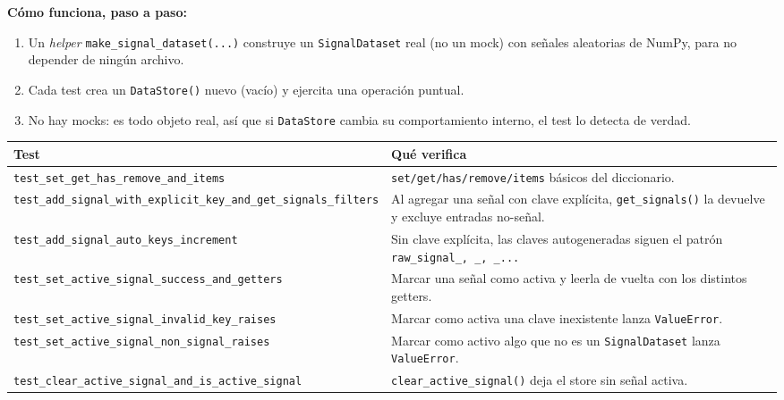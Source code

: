 \documentclass[11pt,a4paper]{article}
\begin{document}
\textbf{Cómo funciona, paso a paso:}
\begin{enumerate}
  \item Un \textit{helper} \texttt{make\_\allowbreak signal\_\allowbreak dataset(...)} construye un \texttt{SignalDataset} real
        (no un mock) con señales aleatorias de NumPy, para no depender de ningún archivo.
  \item Cada test crea un \texttt{DataStore()} nuevo (vacío) y ejercita una operación puntual.
  \item No hay mocks: es todo objeto real, así que si \texttt{DataStore} cambia su comportamiento interno,
        el test lo detecta de verdad.
\end{enumerate}

\begin{center}
\begin{longtable}{L{5.5cm}L{9cm}}
\toprule
\textbf{Test} & \textbf{Qué verifica} \\
\midrule
\endhead
\texttt{test\_\allowbreak set\_\allowbreak get\_\allowbreak has\_\allowbreak remove\_\allowbreak and\_\allowbreak items} & \texttt{set/get/has/remove/items} básicos del diccionario. \\
\texttt{test\_\allowbreak add\_\allowbreak signal\_\allowbreak with\_\allowbreak explicit\_\allowbreak key\_\allowbreak and\_\allowbreak get\_\allowbreak signals\_\allowbreak filters} & Al agregar una señal con clave explícita, \texttt{get\_\allowbreak signals()} la devuelve y excluye entradas no-señal. \\
\texttt{test\_\allowbreak add\_\allowbreak signal\_\allowbreak auto\_\allowbreak keys\_\allowbreak increment} & Sin clave explícita, las claves autogeneradas siguen el patrón \texttt{raw\_\allowbreak signal\_, \_, \_...} \\
\texttt{test\_\allowbreak set\_\allowbreak active\_\allowbreak signal\_\allowbreak success\_\allowbreak and\_\allowbreak getters} & Marcar una señal como activa y leerla de vuelta con los distintos getters. \\
\texttt{test\_\allowbreak set\_\allowbreak active\_\allowbreak signal\_\allowbreak invalid\_\allowbreak key\_\allowbreak raises} & Marcar como activa una clave inexistente lanza \texttt{ValueError}. \\
\texttt{test\_\allowbreak set\_\allowbreak active\_\allowbreak signal\_\allowbreak non\_\allowbreak signal\_\allowbreak raises} & Marcar como activo algo que no es un \texttt{SignalDataset} lanza \texttt{ValueError}. \\
\texttt{test\_\allowbreak clear\_\allowbreak active\_\allowbreak signal\_\allowbreak and\_\allowbreak is\_\allowbreak active\_\allowbreak signal} & \texttt{clear\_\allowbreak active\_\allowbreak signal()} deja el store sin señal activa. \\
\bottomrule
\end{longtable}
\end{center}
\end{document}

